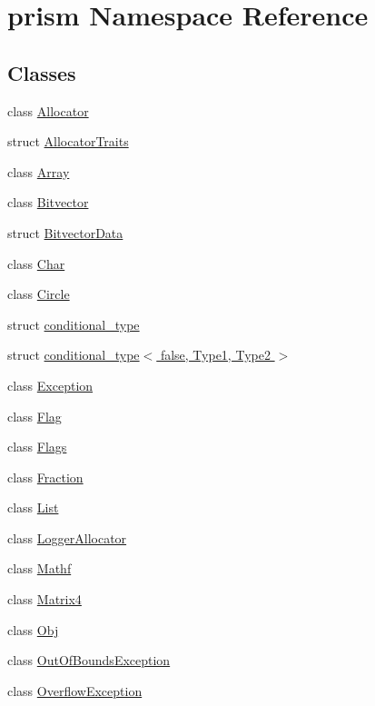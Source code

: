 \hypertarget{namespaceprism}{}\section{prism Namespace Reference}
\label{namespaceprism}
\subsection*{Classes}
\begin{DoxyCompactItemize}
\item 
class \hyperlink{classprism_1_1_allocator}{Allocator}
\item 
struct \hyperlink{structprism_1_1_allocator_traits}{Allocator\+Traits}
\item 
class \hyperlink{classprism_1_1_array}{Array}
\item 
class \hyperlink{classprism_1_1_bitvector}{Bitvector}
\item 
struct \hyperlink{structprism_1_1_bitvector_data}{Bitvector\+Data}
\item 
class \hyperlink{classprism_1_1_char}{Char}
\item 
class \hyperlink{classprism_1_1_circle}{Circle}
\item 
struct \hyperlink{structprism_1_1conditional__type}{conditional\+\_\+type}
\item 
struct \hyperlink{structprism_1_1conditional__type_3_01false_00_01_type1_00_01_type2_01_4}{conditional\+\_\+type$<$ false, Type1, Type2 $>$}
\item 
class \hyperlink{classprism_1_1_exception}{Exception}
\item 
class \hyperlink{classprism_1_1_flag}{Flag}
\item 
class \hyperlink{classprism_1_1_flags}{Flags}
\item 
class \hyperlink{classprism_1_1_fraction}{Fraction}
\item 
class \hyperlink{classprism_1_1_list}{List}
\item 
class \hyperlink{classprism_1_1_logger_allocator}{Logger\+Allocator}
\item 
class \hyperlink{classprism_1_1_mathf}{Mathf}
\item 
class \hyperlink{classprism_1_1_matrix4}{Matrix4}
\item 
class \hyperlink{classprism_1_1_obj}{Obj}
\item 
class \hyperlink{classprism_1_1_out_of_bounds_exception}{Out\+Of\+Bounds\+Exception}
\item 
class \hyperlink{classprism_1_1_overflow_exception}{Overflow\+Exception}

\end{DoxyCompactItemize}

